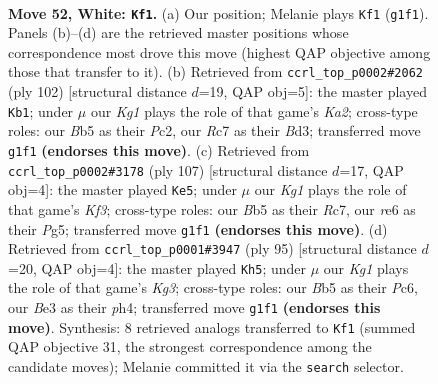 \documentclass[11pt]{article}
\begin{document}
\clearpage

\begin{figure}[p]\centering
\begin{subfigure}{0.46\textwidth}\centering
\resizebox{\linewidth}{!}{%
\newchessgame
\chessboard[
  setfen={6k1/2R5/4r3/1B6/4p2p/4Bp1P/b4P2/6K1 w - - 14 52},
  showmover=false,
  pgfstyle=straightmove, color=movearrow, markmove={g1-f1}
]}
\caption{}
\end{subfigure}\hfill
\begin{subfigure}{0.46\textwidth}\centering
\resizebox{\linewidth}{!}{%
\newchessgame
\chessboard[
  setfen={8/3k4/5b2/p2p4/Pp1p4/3B4/KPP5/8 w - - 4 52},
  showmover=false,
  pgfstyle=straightmove, color=movearrow, markmove={a2-b1}
]}
\caption{}
\end{subfigure}
\\[4pt]
\begin{subfigure}{0.46\textwidth}\centering
\resizebox{\linewidth}{!}{%
\newchessgame
\chessboard[
  setfen={8/2r5/1p3k2/p2P2p1/Pb4B1/3KP3/5P2/R7 b - - 0 54},
  showmover=false,
  pgfstyle=straightmove, color=movearrow, markmove={f6-e5}
]}
\caption{}
\end{subfigure}\hfill
\begin{subfigure}{0.46\textwidth}\centering
\resizebox{\linewidth}{!}{%
\newchessgame
\chessboard[
  setfen={8/8/2p3k1/5p2/p4P1P/P1K3P1/5B2/3b4 b - - 6 48},
  showmover=false,
  pgfstyle=straightmove, color=movearrow, markmove={g6-h5}
]}
\caption{}
\end{subfigure}
\caption{\textbf{Move 52, White: \texttt{Kf1}.} (a) Our position; Melanie plays \texttt{Kf1} (\texttt{g1f1}). Panels (b)--(d) are the retrieved master positions whose correspondence most drove this move (highest QAP objective among those that transfer to it). (b) Retrieved from \texttt{ccrl\_top\_p0002\#2062} (ply 102) [structural distance $d$=19, QAP obj=5]: the master played \texttt{Kb1}; under $\mu$ our \emph{Kg1} plays the role of that game's \emph{Ka2}; cross-type roles: our \emph{B}b5 as their \emph{P}c2, our \emph{R}c7 as their \emph{B}d3; transferred move \texttt{g1f1} \textbf{(endorses this move)}. (c) Retrieved from \texttt{ccrl\_top\_p0002\#3178} (ply 107) [structural distance $d$=17, QAP obj=4]: the master played \texttt{Ke5}; under $\mu$ our \emph{Kg1} plays the role of that game's \emph{Kf3}; cross-type roles: our \emph{B}b5 as their \emph{R}c7, our \emph{r}e6 as their \emph{P}g5; transferred move \texttt{g1f1} \textbf{(endorses this move)}. (d) Retrieved from \texttt{ccrl\_top\_p0001\#3947} (ply 95) [structural distance $d$=20, QAP obj=4]: the master played \texttt{Kh5}; under $\mu$ our \emph{Kg1} plays the role of that game's \emph{Kg3}; cross-type roles: our \emph{B}b5 as their \emph{P}c6, our \emph{B}e3 as their \emph{p}h4; transferred move \texttt{g1f1} \textbf{(endorses this move)}. Synthesis: 8 retrieved analogs transferred to \texttt{Kf1} (summed QAP objective 31, the strongest correspondence among the candidate moves); Melanie committed it via the \texttt{search} selector.}
\label{fig:thought-m102}
\end{figure}
\end{document}

